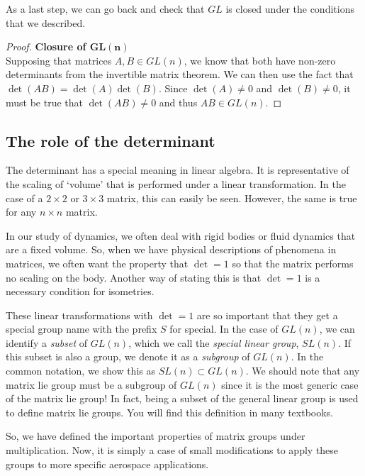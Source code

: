As a last step, we can go back and check that $GL$ is closed under the conditions that we described. 
\begin{proof}
\textbf{Closure of $\mathbf{GL(n)}$}\\
Supposing that matrices $A,B \in GL(n)$, we know that both have non-zero determinants from the invertible matrix theorem. We can then use the fact that $\det(AB)=\det(A)\det(B)$. Since $\det(A)\ne0$ and $\det(B)\ne0$, it must be true that $\det(AB)\ne0$ and thus $AB \in GL(n)$.
\end{proof}


\subsection{The role of the determinant}\label{sec:role of the determinant}

The determinant has a special meaning in linear algebra. It is representative of the scaling of `volume' that is performed under a linear transformation. In the case of a $2\times2$ or $3\times3$ matrix, this can easily be seen. However, the same is true for any $n\times n$ matrix.


In our study of dynamics, we often deal with rigid bodies or fluid dynamics that are a fixed volume. So, when we have physical descriptions of phenomena in matrices, we often want the property that $\det=1$ so that the matrix performs no scaling on the body. Another way of stating this is that $\det=1$ is a necessary condition for isometries.

These linear transformations with $\det=1$ are so important that they get a special group name with the prefix $S$ for special. In the case of $GL(n)$, we can identify a \textit{subset} of $GL(n)$, which we call the \textit{special linear group}, $SL(n)$. If this subset is also a group, we denote it as a \textit{subgroup} of $GL(n)$. In the common notation, we show this as $SL(n) \subset GL(n)$.  We should note that any matrix \gls{lie group} must be a subgroup of $GL(n)$ since it is the most generic case of the matrix \gls{lie group}! In fact, being a subset of the general linear group is used to define matrix \glspl{lie group}. You will find this definition in many textbooks.

So, we have defined the important properties of matrix groups under multiplication. Now, it is simply a case of small modifications to apply these groups to more specific aerospace applications.

